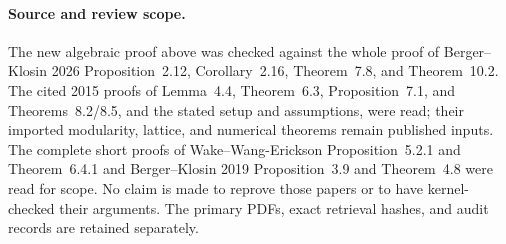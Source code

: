 \paragraph{Source and review scope.}
The new algebraic proof above was checked against the whole
proof of Berger--Klosin 2026 Proposition~2.12, Corollary~2.16,
Theorem~7.8, and Theorem~10.2.  The cited 2015 proofs of
Lemma~4.4, Theorem~6.3, Proposition~7.1, and
Theorems~8.2/8.5, and the stated setup and assumptions, were
read; their imported modularity, lattice, and numerical
theorems remain published inputs.  The complete short
proofs of Wake--Wang-Erickson Proposition~5.2.1 and
Theorem~6.4.1 and Berger--Klosin 2019 Proposition~3.9 and
Theorem~4.8 were read for scope.  No claim is made to
reprove those papers or to have kernel-checked their
arguments.  The primary PDFs, exact retrieval hashes, and
audit records are retained separately.
